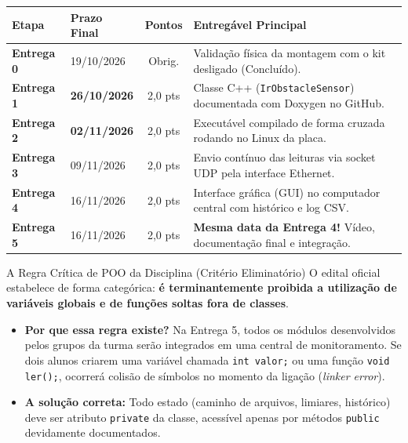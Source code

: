 \documentclass[11pt,a4paper]{article}
\begin{document}
\begin{center}
\begin{tabular}{llcp{7.4cm}}
    \toprule
    \textbf{Etapa} & \textbf{Prazo Final} & \textbf{Pontos} & \textbf{Entregável Principal} \\
    \midrule
    \textbf{Entrega 0} & 19/10/2026 & Obrig. & Validação física da montagem com o kit desligado (Concluído). \\
    \textbf{Entrega 1} & \textbf{26/10/2026} & 2,0 pts & Classe C++ (\texttt{IrObstacleSensor}) documentada com Doxygen no GitHub. \\
    \textbf{Entrega 2} & \textbf{02/11/2026} & 2,0 pts & Executável compilado de forma cruzada rodando no Linux da placa. \\
    \textbf{Entrega 3} & 09/11/2026 & 2,0 pts & Envio contínuo das leituras via socket UDP pela interface Ethernet. \\
    \textbf{Entrega 4} & 16/11/2026 & 2,0 pts & Interface gráfica (GUI) no computador central com histórico e log CSV. \\
    \textbf{Entrega 5} & 16/11/2026 & 2,0 pts & \textbf{Mesma data da Entrega 4!} Vídeo, documentação final e integração. \\
    \bottomrule
\end{tabular}
\end{center}

\begin{alertbox}{A Regra Crítica de POO da Disciplina (Critério Eliminatório)}
O edital oficial estabelece de forma categórica: \textbf{é terminantemente proibida a utilização de variáveis globais e de funções soltas fora de classes}.
\begin{itemize}[leftmargin=*]
    \item \textbf{Por que essa regra existe?} Na Entrega 5, todos os módulos desenvolvidos pelos grupos da turma serão integrados em uma central de monitoramento. Se dois alunos criarem uma variável chamada \texttt{int valor;} ou uma função \texttt{void ler();}, ocorrerá colisão de símbolos no momento da ligação (\textit{linker error}).
    \item \textbf{A solução correta:} Todo estado (caminho de arquivos, limiares, histórico) deve ser atributo \texttt{private} da classe, acessível apenas por métodos \texttt{public} devidamente documentados.
\end{itemize}
\end{alertbox}

\newpage
\end{document}
